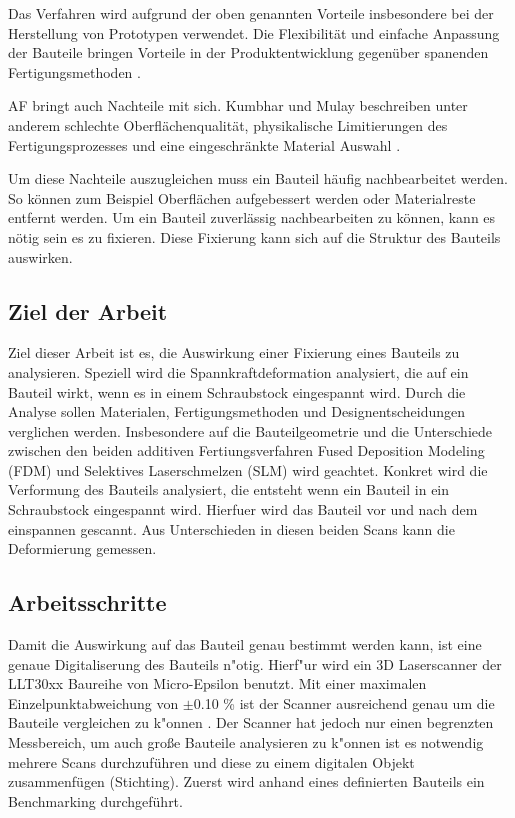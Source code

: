 \documentclass[../main.tex]{subfiles}
\begin{document}
    Das Verfahren wird aufgrund der oben genannten Vorteile insbesondere bei der Herstellung von
    Prototypen verwendet. Die Flexibilität und einfache Anpassung der Bauteile bringen Vorteile in der
    Produktentwicklung gegenüber spanenden Fertigungsmethoden \cite{NYS2023}.
    
    AF bringt auch Nachteile mit sich. Kumbhar und Mulay beschreiben unter 
    anderem schlechte Oberflächenqualität, physikalische Limitierungen des Fertigungsprozesses
    und eine eingeschränkte Material Auswahl \cite{Kumbhar2018}.
    
    Um diese Nachteile auszugleichen muss ein Bauteil häufig nachbearbeitet werden. 
    So können zum Beispiel Oberflächen aufgebessert werden oder Materialreste entfernt werden.
    Um ein Bauteil zuverlässig nachbearbeiten zu können, kann es nötig sein es zu fixieren.
    Diese Fixierung kann sich auf die Struktur des Bauteils auswirken.

    \subsection*{Ziel der Arbeit}
    Ziel dieser Arbeit ist es, die Auswirkung einer Fixierung eines Bauteils zu analysieren.
    Speziell wird die Spannkraftdeformation analysiert, die auf ein Bauteil wirkt, wenn es in einem
    Schraubstock eingespannt wird.
    Durch die Analyse sollen Materialen, Fertigungsmethoden und Designentscheidungen verglichen werden. 
    Insbesondere auf die Bauteilgeometrie und die Unterschiede zwischen den beiden
    additiven Fertiungsverfahren Fused Deposition Modeling (FDM) und Selektives Laserschmelzen (SLM) 
    wird geachtet.
    Konkret wird die Verformung des Bauteils analysiert, die entsteht wenn ein Bauteil
    in ein Schraubstock eingespannt wird. Hierfuer wird das Bauteil vor und nach dem einspannen gescannt.
    Aus Unterschieden in diesen beiden Scans kann die Deformierung gemessen.

    \subsection*{Arbeitsschritte}
    Damit die Auswirkung auf das Bauteil genau bestimmt werden kann, ist eine genaue Digitaliserung 
    des Bauteils n"otig.
    Hierf"ur wird ein 3D Laserscanner der LLT30xx Baureihe von Micro-Epsilon benutzt. Mit einer 
    maximalen Einzelpunktabweichung von $\pm$0.10 \% ist der Scanner ausreichend genau um die Bauteile
    vergleichen zu k"onnen \cite{SCANNER}.
    Der Scanner hat jedoch nur einen begrenzten Messbereich, um auch große Bauteile analysieren 
    zu k"onnen ist es notwendig mehrere Scans durchzuführen und diese
    zu einem digitalen Objekt zusammenfügen (Stichting). 
    Zuerst wird anhand eines definierten Bauteils ein Benchmarking durchgeführt.
\end{document}
